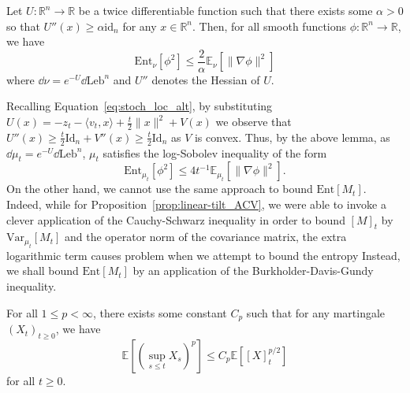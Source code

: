 \begin{lemma}\label{lem:entropy_BL}
  Let \(U : \mathbb{R}^n \to \mathbb{R}\) be a twice differentiable function such that
  there exists some \(\alpha > 0\) so that \(U''(x) \ge \alpha\text{id}_n\) for any \(x \in \mathbb{R}^n\). 
  Then, for all smooth functions
  \(\phi : \mathbb{R}^n \to \mathbb{R}\), we have 
  \[\text{Ent}_\nu[\phi^2] \le \frac{2}{\alpha}\mathbb{E}_\nu[\|\nabla\phi\|^2]\]
  where \(\dd \nu = e^{-U} \dd \text{Leb}^n\) and \(U''\) denotes the Hessian of \(U\).
\end{lemma}

Recalling Equation~\eqref{eq:stoch_loc_alt}, by substituting \(U(x) = - z_t - \langle v_t, x\rangle + \frac{t}{2}\|x\|^2 + V(x)\)
we observe that \(U''(x) \ge \frac{t}{2}\text{Id}_n + V''(x) \ge \frac{t}{2}\text{Id}_n\) as \(V\) is convex.
Thus, by the above lemma, as \(\dd \mu_t = e^{-U} \dd \text{Leb}^n\), \(\mu_t\) satisfies the log-Sobolev 
inequality of the form
\begin{equation}
  \text{Ent}_{\mu_t}[\phi^2] \le 4t^{-1} \mathbb{E}_{\mu_t}[\|\nabla \phi\|^2].
\end{equation} 
On the other hand, we cannot use the same approach to bound \(\text{Ent}[M_t]\). Indeed, while for 
Proposition~\ref{prop:linear-tilt_ACV}, we were able to invoke a clever application of the Cauchy-Schwarz inequality 
in order to bound \([M]_t\) by \(\text{Var}_{\mu_t}[M_t]\) and the operator norm of the covariance matrix, the extra logarithmic term causes problem 
when we attempt to bound the entropy%
Instead, we shall bound \(\text{Ent}[M_t]\) by an application of the Burkholder-Davis-Gundy inequality. 

\begin{lemma}
  For all \(1 \le p < \infty\), there exists some constant \(C_p\) such that for any martingale \((X_t)_{t \ge 0}\),
  we have 
  \[\mathbb{E}\left[\left(\sup_{s \le t} X_s\right)^p\right] \le C_p \mathbb{E}\left[[X]_t^{p / 2}\right]\]
  for all \(t \ge 0\).
\end{lemma}

